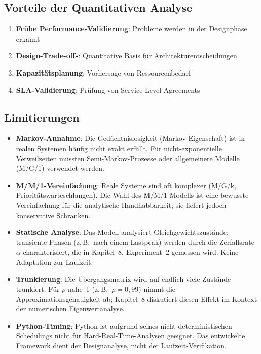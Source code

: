 ﻿\documentclass[a4paper,12pt]{scrreprt}
\theoremstyle{definition}
\begin{document}
\subsection{Vorteile der Quantitativen Analyse}

\begin{enumerate}
	\item[-] \textbf{Frühe Performance-Validierung}: Probleme werden in der Designphase erkannt
	\item[-] \textbf{Design-Trade-offs}: Quantitative Basis für Architekturentscheidungen
	\item[-] \textbf{Kapazitätsplanung}: Vorhersage von Ressourcenbedarf
	\item[-] \textbf{SLA-Validierung}: Prüfung von Service-Level-Agreements
\end{enumerate}

\subsection{Limitierungen}

\begin{itemize}
	\item[-] \textbf{Markov-Annahme}: Die Gedächtnislosigkeit (Markov-Eigenschaft)
	ist in realen Systemen häufig nicht exakt erfüllt.  Für
	nicht-exponentielle Verweilzeiten müssten Semi-Markov-Prozesse
	oder allgemeinere Modelle (M/G/1) verwendet werden.
	
	\item[-] \textbf{M/M/1-Vereinfachung}: Reale Systeme sind oft komplexer
	(M/G/k, Prioritätswarteschlangen).  Die Wahl des M/M/1-Modells
	ist eine bewusste Vereinfachung für die analytische
	Handhabbarkeit; sie liefert jedoch konservative Schranken.
	
	\item[-] \textbf{Statische Analyse}: Das Modell analysiert
	Gleichgewichtszustände; transiente Phasen (z.\,B.\ nach einem
	Lastpeak) werden durch die Zerfallsrate~$\alpha$ charakterisiert,
	die in Kapitel~8, Experiment~2 gemessen wird.  Keine Adaptation
	zur Laufzeit.
	
	\item[-] \textbf{Trunkierung}: Die Übergangsmatrix wird auf endlich viele
	Zustände trunkiert.  Für $\rho$ nahe~1 (z.\,B.\ $\rho = 0{,}99$)
	nimmt die Approximationsgenauigkeit ab; Kapitel~8 diskutiert
	diesen Effekt im Kontext der numerischen Eigenwertanalyse.
	
	\item[-] \textbf{Python-Timing}: Python ist aufgrund seines
	nicht-deterministischen Schedulings nicht für Hard-Real-Time-Analysen
	geeignet.  Das entwickelte Framework dient der Designanalyse, nicht
	der Laufzeit-Verifikation.
\end{itemize}
\end{document}
